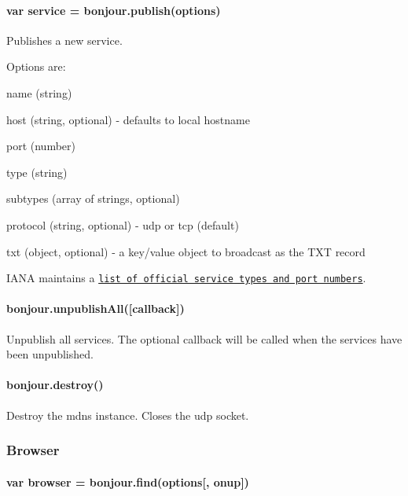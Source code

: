 \paragraph*{{\ttfamily var service = bonjour.\+publish(options)}}

Publishes a new service.

Options are\+:


\begin{DoxyItemize}
\item {\ttfamily name} (string)
\item {\ttfamily host} (string, optional) -\/ defaults to local hostname
\item {\ttfamily port} (number)
\item {\ttfamily type} (string)
\item {\ttfamily subtypes} (array of strings, optional)
\item {\ttfamily protocol} (string, optional) -\/ {\ttfamily udp} or {\ttfamily tcp} (default)
\item {\ttfamily txt} (object, optional) -\/ a key/value object to broadcast as the T\+XT record
\end{DoxyItemize}

I\+A\+NA maintains a \href{http://www.iana.org/assignments/service-names-port-numbers/service-names-port-numbers.xhtml}{\tt list of official service types and port numbers}.

\paragraph*{{\ttfamily bonjour.\+unpublish\+All(\mbox{[}callback\mbox{]})}}

Unpublish all services. The optional {\ttfamily callback} will be called when the services have been unpublished.

\paragraph*{{\ttfamily bonjour.\+destroy()}}

Destroy the mdns instance. Closes the udp socket.

\subsubsection*{Browser}

\paragraph*{{\ttfamily var browser = bonjour.\+find(options\mbox{[}, onup\mbox{]})}}

